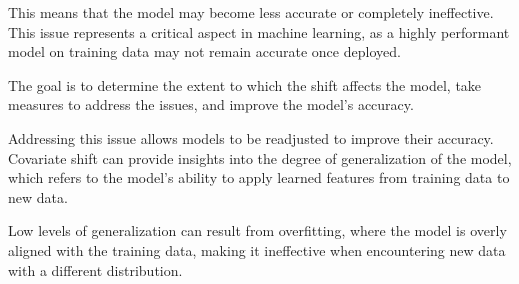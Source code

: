 \vspace{0.5cm}

This means that the model may become less accurate or completely ineffective. This issue represents a critical aspect in machine learning, as a highly performant model on training data may not remain accurate once deployed.

The goal is to determine the extent to which the shift affects the model, take measures to address the issues, and improve the model's accuracy.
	
Addressing this issue allows models to be readjusted to improve their accuracy. Covariate shift can provide insights into the degree of generalization of the model, which refers to the model's ability to apply learned features from training data to new data.

Low levels of generalization can result from overfitting, where the model is overly aligned with the training data, making it ineffective when encountering new data with a different distribution.  
	
	